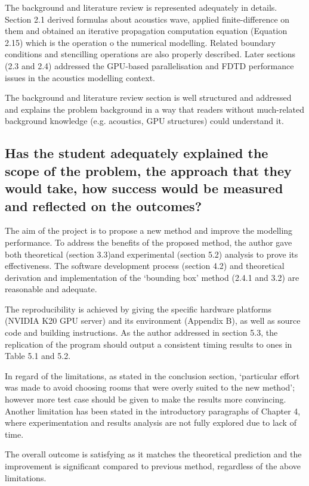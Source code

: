 \documentclass{article}
\begin{document}
The background and literature review is represented adequately in details. Section 2.1 derived formulas about acoustics wave, applied finite-difference on them and obtained an iterative propagation computation equation (Equation 2.15) which is the operation o the numerical modelling. Related boundary conditions and stencilling operations are also properly described. Later sections (2.3 and 2.4) addressed the GPU-based parallelisation and FDTD performance issues in the acoustics modelling context.

The background and literature review section is well structured and addressed and explains the problem background in a way that readers without much-related background knowledge (e.g. acoustics, GPU structures) could understand it.

\subsection*{Has the student adequately explained the scope of the problem, the approach that they would take, how success would be measured and reflected on the outcomes?}

The aim of the project is to propose a new method and improve the modelling performance. To address the benefits of the proposed method, the author gave both theoretical  (section 3.3)and experimental (section 5.2) analysis to prove its effectiveness. The software development process (section 4.2) and theoretical derivation and implementation of the ‘bounding box’ method (2.4.1 and 3.2) are reasonable and adequate.

The reproducibility is achieved by giving the specific hardware platforms (NVIDIA K20 GPU server) and its environment (Appendix B), as well as source code and building instructions. As the author addressed in section 5.3, the replication of the program should output a consistent timing results to ones in Table 5.1 and 5.2.

In regard of the limitations, as stated in the conclusion section, ‘particular effort was made to avoid choosing rooms that were overly suited to the new method’; however more test case should be given to make the results more convincing. Another limitation has been stated in the introductory paragraphs of Chapter 4, where experimentation and results analysis are not fully explored due to lack of time.

The overall outcome is satisfying as it matches the theoretical prediction and the improvement is significant compared to previous method, regardless of the above limitations. 
\end{document}
